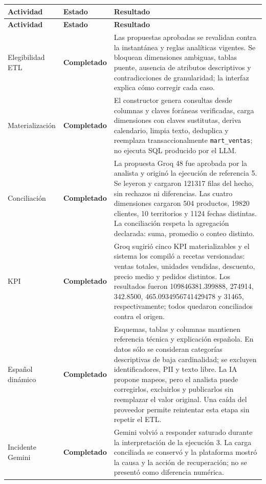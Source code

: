 \documentclass[11pt,letterpaper]{article}
\newcommand{\statusok}{\textcolor{deepgreen}{\textbf{Completado}}}
\newcommand{\file}[1]{\texttt{#1}}
\begin{document}
\begin{longtable}{@{}p{}p{}p{}@{}}
  \toprule
  \textbf{Actividad} & \textbf{Estado} & \textbf{Resultado} \\
  \midrule
  \endfirsthead
  \toprule
  \textbf{Actividad} & \textbf{Estado} & \textbf{Resultado} \\
  \midrule
  \endhead
  Elegibilidad ETL & \statusok & Las propuestas aprobadas se revalidan contra la instantánea y reglas analíticas vigentes. Se bloquean dimensiones ambiguas, tablas puente, ausencia de atributos descriptivos y contradicciones de granularidad; la interfaz explica cómo corregir cada caso. \\
  Materialización & \statusok & El constructor genera consultas desde columnas y claves foráneas verificadas, carga dimensiones con claves sustitutas, deriva calendario, limpia texto, deduplica y reemplaza transaccionalmente \file{mart\_ventas}; no ejecuta SQL producido por el LLM. \\
  Conciliación & \statusok & La propuesta Groq 48 fue aprobada por la analista y originó la ejecución de referencia 5. Se leyeron y cargaron 121317 filas del hecho, sin rechazos ni diferencias. Las cuatro dimensiones cargaron 504 productos, 19820 clientes, 10 territorios y 1124 fechas distintas. La conciliación respeta la agregación declarada: suma, promedio o conteo distinto. \\
  KPI & \statusok & Groq sugirió cinco KPI materializables y el sistema los compiló a recetas versionadas: ventas totales, unidades vendidas, descuento, precio medio y pedidos distintos. Los resultados fueron 109846381.399888, 274914, 342.8500, 465.0934956741429478 y 31465, respectivamente; todos quedaron conciliados contra el origen. \\
  Español dinámico & \statusok & Esquemas, tablas y columnas mantienen referencia técnica y explicación española. En datos sólo se consideran categorías descriptivas de baja cardinalidad; se excluyen identificadores, PII y texto libre. La IA propone mapeos, pero el analista puede corregirlos, excluirlos y publicarlos sin reemplazar el valor original. Una caída del proveedor permite reintentar esta etapa sin repetir el ETL. \\
  Incidente Gemini & \statusok & Gemini volvió a responder saturado durante la interpretación de la ejecución 3. La carga conciliada se conservó y la plataforma mostró la causa y la acción de recuperación; no se presentó como diferencia numérica. \\

\end{longtable}
\end{document}
